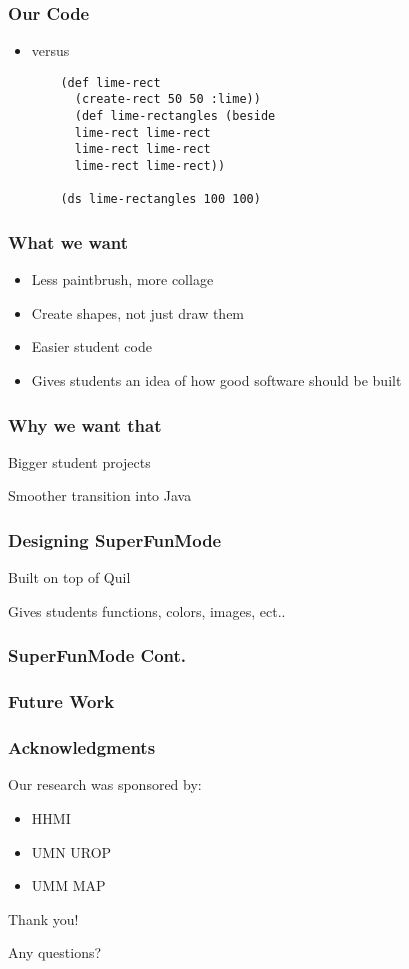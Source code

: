 \documentclass{beamer}
\begin{document}
\begin{frame}[fragile]
\frametitle{Our Code}
	\begin{itemize}
		\item versus
		\begin{verbatim}
	(def lime-rect 
	  (create-rect 50 50 :lime))
	  (def lime-rectangles (beside 
	  lime-rect lime-rect
	  lime-rect lime-rect
	  lime-rect lime-rect))
	  						  
	(ds lime-rectangles 100 100)
			\end{verbatim}
	\end{itemize}
\end{frame}

\begin{frame}
	\frametitle{What we want}
	\begin{itemize}
		\item Less paintbrush, more collage
		\item Create shapes, not just draw them
		\item Easier student code
		\item Gives students an idea of how good software should be built              
	\end{itemize}
\end{frame}

\begin{frame}
	\frametitle{Why we want that}
	\item Bigger student projects
	\item Smoother transition into Java
\end{frame}

\begin{frame}
	\frametitle{Designing SuperFunMode}
	\item Built on top of Quil
	\item Gives students functions, colors, images, ect..
\end{frame}

\begin{frame}
	\frametitle{SuperFunMode Cont.}
\end{frame}

\begin{frame}
	\frametitle{Future Work}
\end{frame}




\begin{frame}
\frametitle{Acknowledgments}
	Our research was sponsored by:
	\begin{itemize}
	\item HHMI
	\item UMN UROP
	\item UMM MAP
	\end{itemize}
	{\centering
	\noindent
	Thank you! \par
	Any questions? \par
	}
\end{frame}
\end{document}
